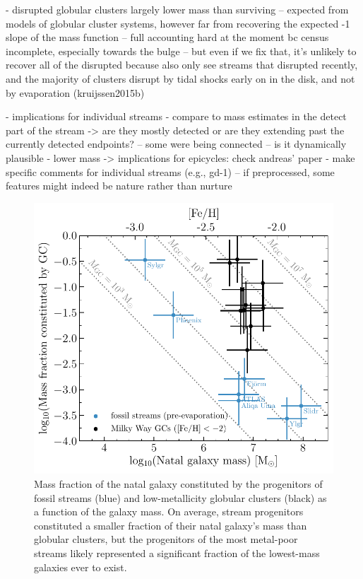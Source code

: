 \documentclass[twocolumn]{aastex63}
\begin{document}
- disrupted globular clusters largely lower mass than surviving
-- expected from models of globular cluster systems, however far from recovering the expected -1 slope of the mass function
-- full accounting hard at the moment bc census incomplete, especially towards the bulge
-- but even if we fix that, it's unlikely to recover all of the disrupted because also only see streams that disrupted recently, and the majority of clusters disrupt by tidal shocks early on in the disk, and not by evaporation (kruijssen2015b)

- implications for individual streams
- compare to mass estimates in the detect part of the stream -> are they mostly detected or are they extending past the currently detected endpoints? -- some were being connected -- is it dynamically plausible
- lower mass -> implications for epicycles: check andreas' paper
- make specific comments for individual streams (e.g., gd-1)
-- if preprocessed, some features might indeed be nature rather than nurture

\begin{figure}
\includegraphics[width=\hsize]{figures/mhost_fraction.pdf}
\caption{
\label{fig:mhost}
Mass fraction of the natal galaxy constituted by the progenitors of fossil streams (blue) and low-metallicity globular clusters (black) as a function of the galaxy mass.
On average, stream progenitors constituted a smaller fraction of their natal galaxy's mass than globular clusters, but the progenitors of the most metal-poor streams likely represented a significant fraction of the lowest-mass galaxies ever to exist.
}
\end{figure}
\end{document}
